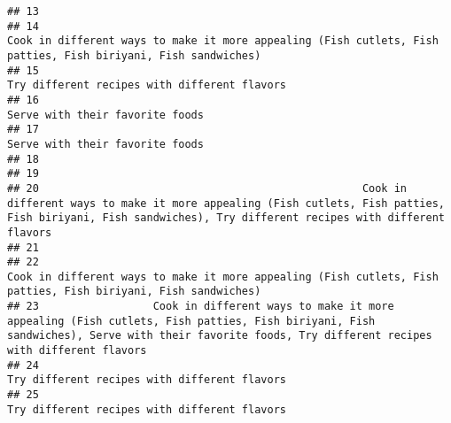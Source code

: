 \documentclass[
]{article}
\begin{document}
\begin{verbatim}
## 13                                                                                                                                                                                                              
## 14                                                                                                 Cook in different ways to make it more appealing (Fish cutlets, Fish patties, Fish biriyani, Fish sandwiches)
## 15                                                                                                                                                                  Try different recipes with different flavors
## 16                                                                                                                                                                               Serve with their favorite foods
## 17                                                                                                                                                                               Serve with their favorite foods
## 18                                                                                                                                                                                                              
## 19                                                                                                                                                                                                              
## 20                                                   Cook in different ways to make it more appealing (Fish cutlets, Fish patties, Fish biriyani, Fish sandwiches), Try different recipes with different flavors
## 21                                                                                                                                                                                                              
## 22                                                                                                 Cook in different ways to make it more appealing (Fish cutlets, Fish patties, Fish biriyani, Fish sandwiches)
## 23                  Cook in different ways to make it more appealing (Fish cutlets, Fish patties, Fish biriyani, Fish sandwiches), Serve with their favorite foods, Try different recipes with different flavors
## 24                                                                                                                                                                  Try different recipes with different flavors
## 25                                                                                                                                                                  Try different recipes with different flavors

\end{verbatim}
\end{document}
